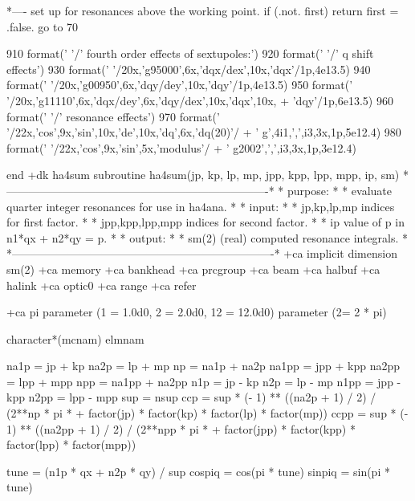 *---- set up for resonances above the working point.
      if (.not. first) return
      first = .false.
      go to 70
 
  910 format(' '/' fourth order effects of sextupoles:')
  920 format(' '/' q shift effects')
  930 format(' '/20x,'g95000',6x,'dqx/dex',10x,'dqx'/1p,4e13.5)
  940 format(' '/20x,'g00950',6x,'dqy/dey',10x,'dqy'/1p,4e13.5)
  950 format(' '/20x,'g11110',6x,'dqx/dey',6x,'dqy/dex',10x,'dqx',10x,
     +       'dqy'/1p,6e13.5)
  960 format(' '/' resonance effects')
  970 format(' '/22x,'cos',9x,'sin',10x,'de',10x,'dq',6x,'dq(20)'/
     +       ' g',4i1,',',i3,3x,1p,5e12.4)
  980 format(' '/22x,'cos',9x,'sin',5x,'modulus'/
     +       ' g2002',',',i3,3x,1p,3e12.4)
 
      end
+dk ha4sum
      subroutine ha4sum(jp, kp, lp, mp, jpp, kpp, lpp, mpp, ip, sm)
*----------------------------------------------------------------------*
* purpose:                                                             *
*   evaluate quarter integer resonances for use in ha4ana.             *
* input:                                                               *
*   jp,kp,lp,mp         indices for first factor.                      *
*   jpp,kpp,lpp,mpp     indices for second factor.                     *
*   ip                  value of p in n1*qx + n2*qy = p.               *
* output:                                                              *
*   sm(2)     (real)    computed resonance integrals.                  *
*----------------------------------------------------------------------*
+ca implicit
      dimension         sm(2)
+ca memory
+ca bankhead
+ca prcgroup
+ca beam
+ca halbuf
+ca halink
+ca optic0
+ca range
+ca refer
 
+ca pi
      parameter         (1 = 1.0d0, 2 = 2.0d0, 12 = 12.0d0)
      parameter         (2\pi = 2 * pi)
 
      character*(mcnam) elmnam
 
      na1p   = jp + kp
      na2p   = lp + mp
      np     = na1p + na2p
      na1pp  = jpp + kpp
      na2pp  = lpp + mpp
      npp    = na1pp + na2pp
      n1p    = jp - kp
      n2p    = lp - mp
      n1pp   = jpp - kpp
      n2pp   = lpp - mpp
      sup    = nsup
      ccp    = sup * (- 1) ** ((na2p + 1) / 2) / (2**np * pi *
     +         factor(jp) * factor(kp) * factor(lp) * factor(mp))
      ccpp   = sup * (- 1) ** ((na2pp + 1) / 2) / (2**npp * pi *
     +         factor(jpp) * factor(kpp) * factor(lpp) * factor(mpp))
 
      tune = (n1p * qx + n2p * qy) / sup
      cospiq = cos(pi * tune)
      sinpiq = sin(pi * tune)
 
